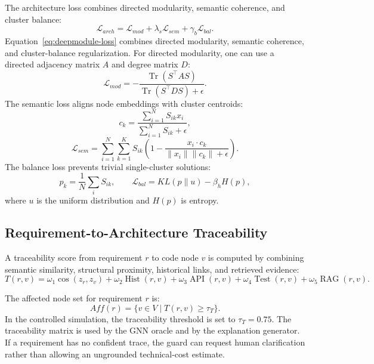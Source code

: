 \documentclass[english,preprint,nonatbib]{elsarticle}
\newcommand{\loss}{\mathcal{L}}
\begin{document}
The architecture loss combines directed modularity, semantic coherence, and cluster balance:
\begin{equation}
\label{eq:deepmodule-loss}
    \loss_{arch} = \loss_{mod} + \lambda_s \loss_{sem} + \gamma_b \loss_{bal}.
\end{equation}
Equation~\ref{eq:deepmodule-loss} combines directed modularity, semantic coherence, and cluster-balance regularization. For directed modularity, one can use a directed adjacency matrix $A$ and degree matrix $D$:
\begin{equation}
    \loss_{mod} = -\frac{\operatorname{Tr}(S^\top A S)}{\operatorname{Tr}(S^\top D S)+\epsilon}.
\end{equation}
The semantic loss aligns node embeddings with cluster centroids:
\begin{equation}
    c_k = \frac{\sum_{i=1}^{N} S_{ik}x_i}{\sum_{i=1}^{N}S_{ik}+\epsilon},
\end{equation}
\begin{equation}
    \loss_{sem} = \sum_{i=1}^{N}\sum_{k=1}^{K}S_{ik}\left(1-\frac{x_i\cdot c_k}{\lVert x_i\rVert\lVert c_k\rVert + \epsilon}\right).
\end{equation}
The balance loss prevents trivial single-cluster solutions:
\begin{equation}
    p_k = \frac{1}{N}\sum_i S_{ik}, \qquad \loss_{bal} = KL(p\|u) - \beta_h H(p),
\end{equation}
where $u$ is the uniform distribution and $H(p)$ is entropy.

\subsection{Requirement-to-Architecture Traceability}

A traceability score from requirement $r$ to code node $v$ is computed by combining semantic similarity, structural proximity, historical links, and retrieved evidence:
\begin{equation}
T(r,v)
=
\omega_1 \cos(z_r,z_v)
+ \omega_2 \operatorname{Hist}(r,v)
+ \omega_3 \operatorname{API}(r,v)
+ \omega_4 \operatorname{Test}(r,v)
+ \omega_5 \operatorname{RAG}(r,v).
\end{equation}

The affected node set for requirement $r$ is:
\begin{equation}
    Aff(r) = \{v \in V \mid T(r,v) \geq \tau_T\}.
\end{equation}
In the controlled simulation, the traceability threshold is set to $\tau_T=0.75$. The traceability matrix is used by the GNN oracle and by the explanation generator.
If a requirement has no confident trace, the guard can request human clarification rather than allowing an ungrounded technical-cost estimate.
\end{document}
